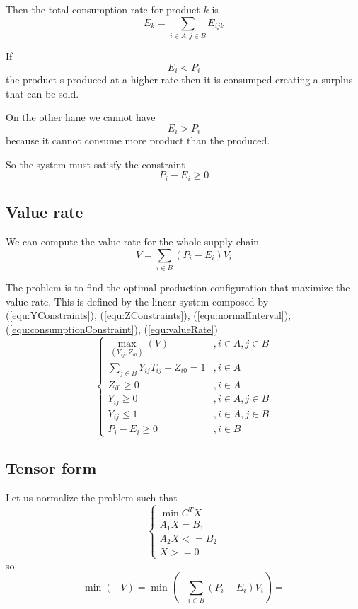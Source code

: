 \documentclass[a4paper,11pt]{article}
\begin{document}
Then the total consumption rate for product $ k $ is
	\[ E_{k} = \sum_{i \in A, j \in B} E_{ijk} \]

If
	\[ E_i < P_i \]
the product s produced at a higher rate then it is consumped creating a surplus that can be sold.

On the other hane we cannot have 
	\[ E_i > P_i \]
because it cannot consume more product than the produced.

So the system must satisfy the constraint
\begin{equation}
\label{equ:consumptionConstraint}
	P_i - E_i \ge 0
\end{equation}
	
\subsection{Value rate}
We can compute the value rate for the whole supply chain
\begin{equation}
\label{equ:valueRate}
	V = \sum_{i \in B}( P_i - E_i ) V_i
\end{equation}

The problem is to find the optimal production configuration that maximize the value rate. This is defined by the linear system composed by
(\ref{equ:YConstraints}),
(\ref{equ:ZConstraints}),
(\ref{equ:normalInterval}),
(\ref{equ:consumptionConstraint}),
(\ref{equ:valueRate})
\[
\left\{
\begin{array}{ll}
	\max_{(Y_{ij}, Z_{i0})} (V) & , i \in A, j \in B \\
	\sum_{j \in B} Y_{ij} T_{ij} + Z_{i0} = 1 & , i \in A \\
	Z_{i0} \ge 0 & , i \in A \\
	Y_{ij} \ge 0 & , i \in A, j \in B \\
	Y_{ij} \le 1 & , i \in A, j \in B \\
	P_i - E_i \ge 0 & , i \in B
\end{array}
\right.
\]

\subsection{Tensor form}

Let us normalize the problem such that
\[
\left\{
\begin{array}{ll}
	\min C^T X \\
	A_1 X = B_1 \\
	A_2 X <= B_2 \\
	X >= 0
\end{array}
\right.
\]
so
\[
	\min (-V) = 
	\min (-\sum_{i \in B}( P_i - E_i ) V_i) = 
\]
\end{document}
